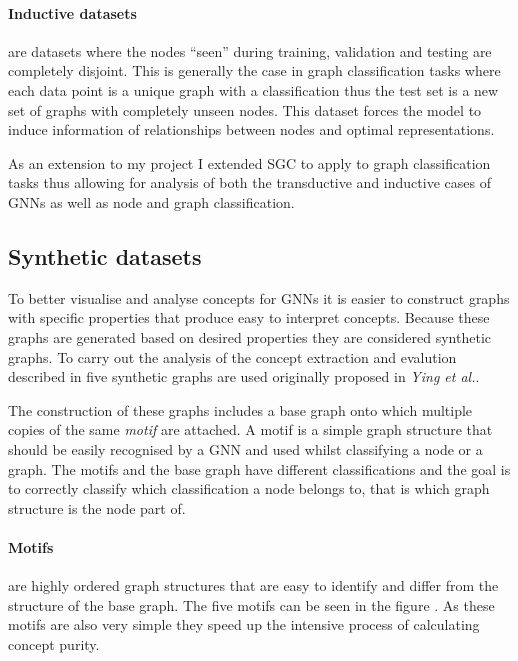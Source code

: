 \paragraph{Inductive datasets} are datasets where the nodes ``seen'' during training, validation and testing are completely disjoint.
This is generally the case in graph classification tasks where each data point is a unique graph with a classification thus the test set is a new set of graphs with completely unseen nodes.
This dataset forces the model to induce information of relationships between nodes and optimal representations.

As an extension to my project I extended SGC to apply to graph classification tasks thus allowing for analysis of both the transductive and inductive cases of GNNs as well as node and graph classification.

\subsection{Synthetic datasets}


To better visualise and analyse concepts for GNNs it is easier to construct graphs with specific properties that produce easy to interpret concepts.
Because these graphs are generated based on desired properties they are considered synthetic graphs.
To carry out the analysis of the concept extraction and evalution described in  five synthetic graphs are used originally proposed in \textit{Ying et al.}\cite{ying2019gnnexplainer}.

The construction of these graphs includes a base graph onto which multiple copies of the same \emph{motif} are attached.
A motif is a simple graph structure that should be easily recognised by a GNN and used whilst classifying a node or a graph.
The motifs and the base graph have different classifications and the goal is to correctly classify which classification a node belongs to, that is which graph structure is the node part of.

\paragraph{Motifs} are highly ordered graph structures that are easy to identify and differ from the structure of the base graph.
The five motifs can be seen in the figure .
As these motifs are also very simple they speed up the intensive process of calculating concept purity.

